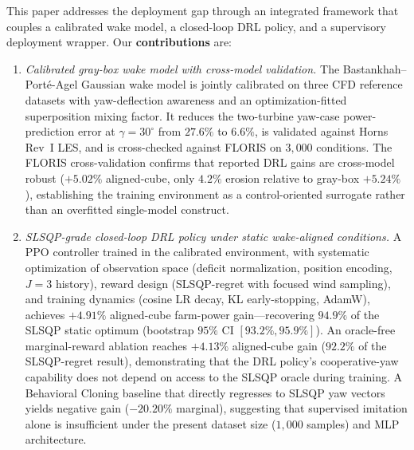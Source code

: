\documentclass[final,5p,times]{elsarticle}
\begin{document}
This paper addresses the deployment gap through an integrated framework that couples a calibrated wake model, a closed-loop DRL policy, and a supervisory deployment wrapper. Our \textbf{contributions} are:
\begin{enumerate}
\item \emph{Calibrated gray-box wake model with cross-model validation.} The Bastankhah--Port\'e-Agel Gaussian wake model is jointly calibrated on three CFD reference datasets with yaw-deflection awareness and an optimization-fitted superposition mixing factor. It reduces the two-turbine yaw-case power-prediction error at $\gamma\!=\!30^\circ$ from $27.6\%$ to $6.6\%$, is validated against Horns Rev~I LES, and is cross-checked against FLORIS on $3{,}000$ conditions. The FLORIS cross-validation confirms that reported DRL gains are cross-model robust ($+5.02\%$ aligned-cube, only $4.2\%$ erosion relative to gray-box $+5.24\%$), establishing the training environment as a control-oriented surrogate rather than an overfitted single-model construct.
\item \emph{SLSQP-grade closed-loop DRL policy under static wake-aligned conditions.} A PPO controller trained in the calibrated environment, with systematic optimization of observation space (deficit normalization, position encoding, $J{=}3$ history), reward design (SLSQP-regret with focused wind sampling), and training dynamics (cosine LR decay, KL early-stopping, AdamW), achieves $+4.91\%$ aligned-cube farm-power gain---recovering $94.9\%$ of the SLSQP static optimum (bootstrap $95\%$ CI $[93.2\%,95.9\%]$). An oracle-free marginal-reward ablation reaches $+4.13\%$ aligned-cube gain ($92.2\%$ of the SLSQP-regret result), demonstrating that the DRL policy's cooperative-yaw capability does not depend on access to the SLSQP oracle during training. A Behavioral Cloning baseline that directly regresses to SLSQP yaw vectors yields negative gain ($-20.20\%$ marginal), suggesting that supervised imitation alone is insufficient under the present dataset size ($1{,}000$ samples) and MLP architecture.

\end{enumerate}
\end{document}
